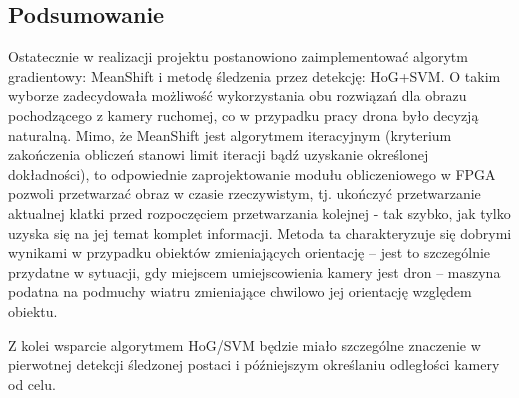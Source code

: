 
\subsection{Podsumowanie}

Ostatecznie w realizacji projektu postanowiono zaimplementować algorytm gradientowy: MeanShift i metodę śledzenia przez detekcję: HoG+SVM. %
O takim wyborze zadecydowała możliwość wykorzystania obu rozwiązań dla obrazu pochodzącego z kamery ruchomej, co w przypadku pracy drona było decyzją naturalną. %
Mimo, że MeanShift jest algorytmem iteracyjnym (kryterium zakończenia obliczeń stanowi limit iteracji bądź uzyskanie określonej dokładności), to odpowiednie zaprojektowanie modułu obliczeniowego w FPGA pozwoli przetwarzać obraz w czasie rzeczywistym, tj. ukończyć przetwarzanie aktualnej klatki przed rozpoczęciem przetwarzania kolejnej - tak szybko, jak tylko uzyska się na jej temat komplet informacji. %
Metoda ta charakteryzuje się dobrymi wynikami w przypadku obiektów zmieniających orientację -- jest to szczególnie przydatne w sytuacji, gdy miejscem umiejscowienia kamery jest dron -- maszyna podatna na podmuchy wiatru zmieniające chwilowo jej orientację względem obiektu. 

Z kolei wsparcie algorytmem HoG/SVM będzie miało szczególne znaczenie w pierwotnej detekcji śledzonej postaci i późniejszym określaniu odległości kamery od celu. %


